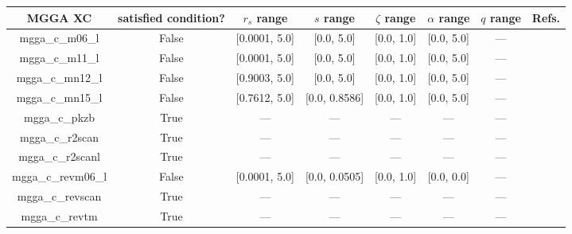 \begin{tabular}{|c|c|c|c|c|c|c|l|}
\hline
           MGGA XC &  satisfied condition? &   $r_s$ range &     $s$ range & $\zeta$ range & $\alpha$ range & $q$ range  &                                                     Refs. \\ \hline
   mgga\_c\_m06\_l &                 False & [0.0001, 5.0] &    [0.0, 5.0] &    [0.0, 1.0] &     [0.0, 5.0] &        --- &                       \cite{Zhao2006_194101,Zhao2008_215} \\ \hline
   mgga\_c\_m11\_l &                 False & [0.0001, 5.0] &    [0.0, 5.0] &    [0.0, 1.0] &     [0.0, 5.0] &        --- &                                   \cite{Peverati2012_117} \\ \hline
  mgga\_c\_mn12\_l &                 False & [0.9003, 5.0] &    [0.0, 5.0] &    [0.0, 1.0] &     [0.0, 5.0] &        --- &                                 \cite{Peverati2012_13171} \\ \hline
  mgga\_c\_mn15\_l &                 False & [0.7612, 5.0] & [0.0, 0.8586] &    [0.0, 1.0] &     [0.0, 5.0] &        --- &                                        \cite{Yu2016_1280} \\ \hline
     mgga\_c\_pkzb &                  True &           --- &           --- &           --- &            --- &        --- &                                    \cite{Perdew1999_2544} \\ \hline
   mgga\_c\_r2scan &                  True &           --- &           --- &           --- &            --- &        --- &                  \cite{Furness2020_8208,Furness2020_9248} \\ \hline
  mgga\_c\_r2scanl &                  True &           --- &           --- &           --- &            --- &        --- & \cite{Mejia2020_121109,Furness2020_8208,Furness2020_9248} \\ \hline
mgga\_c\_revm06\_l &                 False & [0.0001, 5.0] & [0.0, 0.0505] &    [0.0, 1.0] &     [0.0, 0.0] &        --- &                                      \cite{Wang2017_8487} \\ \hline
  mgga\_c\_revscan &                  True &           --- &           --- &           --- &            --- &        --- &                                     \cite{Mezei2018_2469} \\ \hline
    mgga\_c\_revtm &                  True &           --- &           --- &           --- &            --- &        --- &                                      \cite{Jana2019_6356} \\ \hline

\end{tabular}
